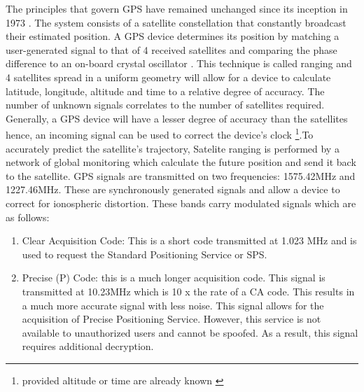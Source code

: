 The principles that govern GPS have remained unchanged since its inception in 1973 \cite{spilker1996global}. The system consists of a satellite constellation that constantly broadcast their estimated position. A GPS device determines its position by matching a user-generated signal to that of 4 received satellites and comparing the phase difference to an on-board crystal oscillator \cite{spilker1996global}. This technique is called ranging and 4 satellites spread in a uniform geometry will allow for a device to calculate latitude, longitude, altitude and time to a relative degree of accuracy. The number of unknown signals correlates to the number of satellites required. Generally, a GPS device will have a lesser degree of accuracy than the satellites hence, an incoming signal can be used to correct the device's clock \footnote{provided altitude or time are already known \cite{spilker1996global}}.To accurately predict the satellite's trajectory, Satelite ranging is performed by a network of global monitoring which calculate the future position and send it back to the satellite. GPS signals are transmitted on two frequencies: 1575.42MHz and 1227.46MHz\cite{spilker1996global}. These are synchronously generated signals and allow a device to correct for ionospheric distortion. These bands carry modulated signals which are as follows: \cite{spilker1996global}


\begin{enumerate}
	\item Clear Acquisition Code:  This is a short code transmitted at 1.023 MHz and is used to request the Standard Positioning Service or SPS.
	\item Precise (P) Code: this is a much longer acquisition code. This signal is transmitted at 10.23MHz which is 10 x the rate of a CA code. This results in a much more accurate signal with less noise. This signal allows for the acquisition of Precise Positioning Service. However, this service is not available to unauthorized users and cannot be spoofed. As a result, this signal requires additional decryption.    
\end{enumerate}

